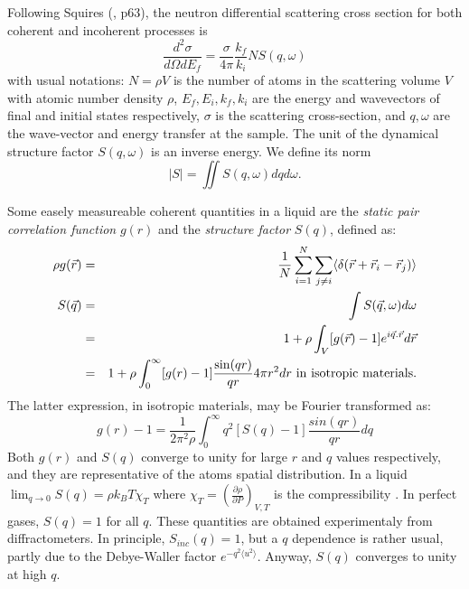 Following Squires (\cite{squires}, p63), the neutron differential scattering cross section for both coherent and incoherent processes is
\begin{equation}\label{eq:d2sigma}
\frac{d^2\sigma}{d\Omega dE_f} = \frac{\sigma}{4\pi}\frac{k_f}{k_i} N S(q, \omega)
\end{equation}
with usual notations: $N=\rho V$ is the number of atoms in the scattering volume $V$ with atomic number density $\rho$, $E_f, E_i, k_f, k_i$ are the energy and wavevectors of final and initial states respectively, $\sigma$ is the scattering cross-section, and $q,\omega$ are the wave-vector and energy transfer at the sample. The unit of the dynamical structure factor $S(q,\omega)$ is an inverse energy. We define its norm
\begin{equation}
|S| = \iint S(q,\omega) dq d\omega .
\end{equation}

Some easely measureable coherent quantities in a liquid are the \emph{static pair correlation function} $g(r)$ and the \emph{structure factor} $S(q)$, defined as:
\begin{eqnarray}
\rho g(\vec{r}) &=& \frac{1}{N} \sum_{i=1}^N \sum_{j \neq i} \langle \delta(\vec{r}+\vec{r}_i-\vec{r}_j) \rangle \\
S(\vec{q}) &=&\int S(\vec q,\omega) d\omega \label{eq:sq} \\
           &=&1 + \rho \int_V [g(\vec{r})-1] e^{i\vec{q}.\vec{r}} d\vec{r} \\
           &=&1 + \rho \int_{0}^{\infty} [g(r)-1] \frac{\sin(qr)}{qr} 4 \pi r^2 dr {\rm\ in\ isotropic\ materials.}
\end{eqnarray}
The latter expression, in isotropic materials, may be Fourier transformed as:
\begin{equation}
\label{eq:gr-sq}
g(r)-1 =\frac{1}{2\pi^2 \rho} \int_0^\infty q^2 [S(q) -1] \frac{sin(qr)}{qr} dq
\end{equation}
Both $g(r)$ and $S(q)$ converge to unity for large $r$ and $q$ values respectively, and they are representative of the atoms spatial distribution. In a liquid $\lim_{q \rightarrow 0} S(q) = \rho k_B T \chi_T$ where $\chi_T=(\frac{\partial \rho}{\partial P})_{V,T}$ is the compressibility \cite{Egelstaff67,fischer05}. In perfect gases, $S(q) = 1$ for all $q$. These quantities are obtained experimentaly from diffractometers.
In principle, $S_{inc}(q) = 1$, but a $q$ dependence is rather usual, partly due to the Debye-Waller factor $e^{-q^2 \langle u^2 \rangle}$. Anyway, $S(q)$ converges to unity at high $q$.

